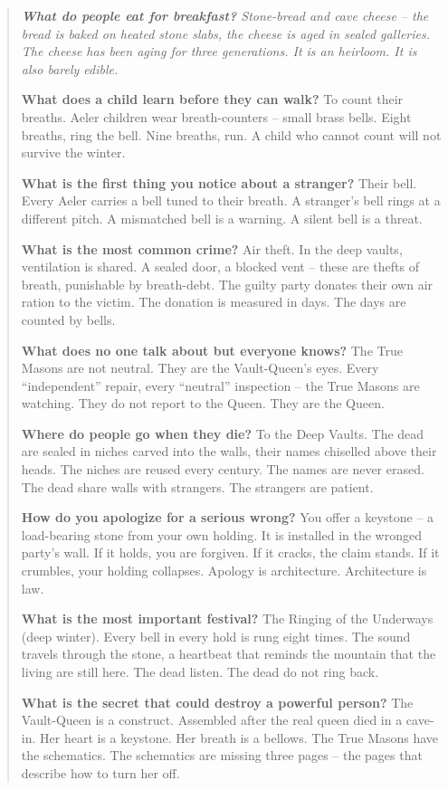 \documentclass[12pt,oneside]{book}
\newenvironment{almanac}
  {\begin{quote}\small\itshape}
  {\end{quote}}
\begin{document}
\vspace{1em}
\begin{almanac}
\textbf{What do people eat for breakfast?} Stone-bread and cave cheese -- the bread is baked on heated stone slabs, the cheese is aged in sealed galleries. The cheese has been aging for three generations. It is an heirloom. It is also barely edible.

\textbf{What does a child learn before they can walk?} To count their breaths. Aeler children wear breath-counters -- small brass bells. Eight breaths, ring the bell. Nine breaths, run. A child who cannot count will not survive the winter.

\textbf{What is the first thing you notice about a stranger?} Their bell. Every Aeler carries a bell tuned to their breath. A stranger's bell rings at a different pitch. A mismatched bell is a warning. A silent bell is a threat.

\textbf{What is the most common crime?} Air theft. In the deep vaults, ventilation is shared. A sealed door, a blocked vent -- these are thefts of breath, punishable by breath-debt. The guilty party donates their own air ration to the victim. The donation is measured in days. The days are counted by bells.

\textbf{What does no one talk about but everyone knows?} The True Masons are not neutral. They are the Vault-Queen's eyes. Every ``independent'' repair, every ``neutral'' inspection -- the True Masons are watching. They do not report to the Queen. They are the Queen.

\textbf{Where do people go when they die?} To the Deep Vaults. The dead are sealed in niches carved into the walls, their names chiselled above their heads. The niches are reused every century. The names are never erased. The dead share walls with strangers. The strangers are patient.

\textbf{How do you apologize for a serious wrong?} You offer a keystone -- a load-bearing stone from your own holding. It is installed in the wronged party's wall. If it holds, you are forgiven. If it cracks, the claim stands. If it crumbles, your holding collapses. Apology is architecture. Architecture is law.

\textbf{What is the most important festival?} The Ringing of the Underways (deep winter). Every bell in every hold is rung eight times. The sound travels through the stone, a heartbeat that reminds the mountain that the living are still here. The dead listen. The dead do not ring back.

\textbf{What is the secret that could destroy a powerful person?} The Vault-Queen is a construct. Assembled after the real queen died in a cave-in. Her heart is a keystone. Her breath is a bellows. The True Masons have the schematics. The schematics are missing three pages -- the pages that describe how to turn her off.
\end{almanac}
\end{document}
